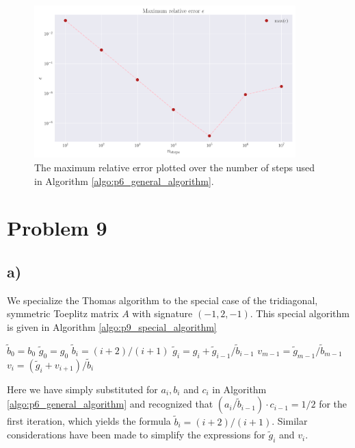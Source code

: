 \documentclass[english,notitlepage,nofootinbib]{revtex4-1}  %
\newcommand{\Algo}[1]{Algorithm \ref{algo:#1}}
\begin{document}
\begin{figure}[h!]
    \centering
    \includegraphics[width=0.9\textwidth]{max_relative_error.pdf}
    \caption{The maximum relative error plotted over the number of steps used in \Algo{p6_general_algorithm}.}\label{fig:p8_max_rel_err}
\end{figure}

\section*{Problem 9}

\subsection*{a)}

We specialize the Thomas algorithm to the special case of the tridiagonal, symmetric Toeplitz matrix $A$ with signature $(-1,2,-1)$. This special algorithm is given in Algorithm \ref{algo:p9_special_algorithm} 

\begin{algorithm}[H]
    \caption{Special algorithm}\label{algo:p9_special_algorithm}
    \begin{algorithmic}
        \State $\tilde{b}_0 = b_0$ 
        \State $\tilde{g}_0 = g_0$
        \State $\tilde{b}_i = (i+2)/(i+1)$ 
        \State $\tilde{g}_i = g_i + \tilde{g}_{i-1} / \tilde{b}_{i-1}$
        \EndFor
        \State $v_{m-1} = \tilde{g}_{m-1} / \tilde{b}_{m-1}$
        \State $v_i = (\tilde{g}_i + v_{i+1} ) / \tilde{b}_i$ 
        \EndFor
    \end{algorithmic}
\end{algorithm}

Here we have simply substituted for $a_i, b_i$ and $c_i$ in \Algo{p6_general_algorithm} and recognized that $(a_i/\tilde{b}_{i-1}) \cdot c_{i-1}=1/2$ for the first iteration, which yields the formula $\tilde{b}_i=(i+2)/(i+1)$. Similar considerations have been made to simplify the expressions for $\tilde{g}_i$ and $v_i$. 
\end{document}
